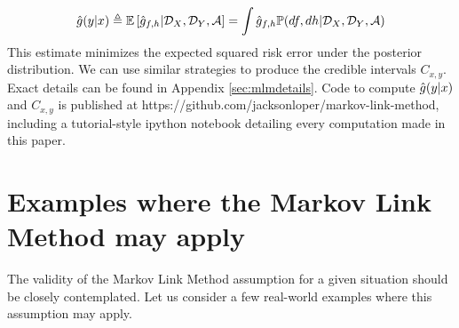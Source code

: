 \[
\hat {g}(y|x) \triangleq \mathbb{E}\left[\hat {g}_{f,h} | {\mathcal{D}_X},{\mathcal{D}_Y},\mathcal{A} \right]
               = \int \hat {g}_{f,h} \mathbb{P}(df,dh | {\mathcal{D}_X},{\mathcal{D}_Y},\mathcal{A}) 
\]
This estimate minimizes the expected squared risk error under the posterior distribution.  We can use similar strategies to produce the credible intervals $C_{x,y}$.  Exact details can be found in Appendix \ref{sec:mlmdetails}.  Code to compute $\hat {g}(y|x)$ and $C_{x,y}$ is published at https://github.com/jacksonloper/markov-link-method, including a tutorial-style ipython notebook detailing every computation made in this paper.


\section{Examples where the Markov Link Method may apply}

\label{sec:examples}

The validity of the Markov Link Method assumption for a given situation should be closely contemplated.  Let us consider a few real-world examples where this assumption may apply.

